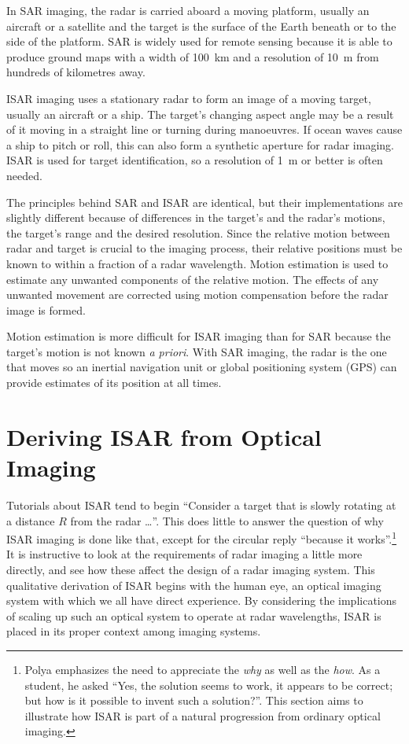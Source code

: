 In SAR imaging, the radar is carried aboard a moving platform, usually an
aircraft or a satellite and the target is the surface of the Earth beneath or
to the side of the platform.  SAR is widely used for remote sensing because
it is able to produce ground maps with a width of 100~km and a resolution 
of 10~m from hundreds of kilometres away.

ISAR imaging uses a stationary radar to form an image of a moving target,
usually an aircraft or a ship.  The target's changing aspect angle may be
a result of it moving in a straight line or turning during manoeuvres.  If 
ocean waves cause a ship to pitch or roll, this can also form a synthetic 
aperture for radar imaging.  ISAR is used for target identification, so a
resolution of 1~m or better is often needed.

The principles behind SAR and ISAR are identical, but their implementations
are slightly different because of differences in the target's and the
radar's motions, the target's range and the desired resolution.  Since the
relative motion between radar and target is crucial to the imaging process,
their relative positions must be known to within a fraction of a radar
wavelength.  Motion estimation is used to estimate any unwanted components 
of the relative motion.  The effects of any unwanted movement are corrected
using motion compensation before the radar image is formed.

Motion estimation is more difficult for ISAR imaging than for SAR because
the target's motion is not known {\em a priori\/}.  With SAR imaging, 
the radar is the one that moves so an inertial navigation unit or
global positioning system (GPS) can provide estimates of its position at all 
times.


\section{Deriving ISAR from Optical Imaging}
\label{hrr sec:qual}


Tutorials about ISAR tend to begin ``Consider a target that is slowly rotating
at a distance $R$ from the radar \ldots''.  This does little to answer
the question of why ISAR imaging is done like that, except for the circular
reply ``because it works''.\footnote{Polya emphasizes the need to appreciate
the {\em why\/} as well as the {\em how\/}.  As a student, he asked ``Yes,
the solution seems to work, it appears to be correct; but how is it possible
to invent such a solution?''\protect\cite[p. vi]{Pol57}.  This section aims
to illustrate how ISAR is part of a natural progression from ordinary
optical imaging.}  It is instructive to look at the requirements of radar
imaging a little more directly, and see how these affect the design of a
radar imaging system.  This qualitative derivation of ISAR begins with the
human eye, an optical imaging system with which we all have direct
experience.  By considering the implications of scaling up such an optical
system to operate at radar wavelengths, ISAR is placed in its proper context
among imaging systems.

